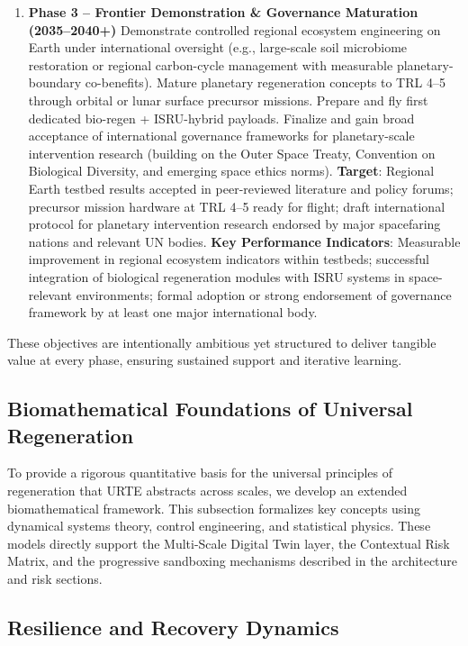 \documentclass[11pt,a4paper]{article}
\begin{document}
\begin{enumerate}[leftmargin=*,itemsep=0.25em]
    \item \textbf{Phase 3 -- Frontier Demonstration \& Governance Maturation (2035--2040+)}  
    Demonstrate controlled regional ecosystem engineering on Earth under international oversight (e.g., large-scale soil microbiome restoration or regional carbon-cycle management with measurable planetary-boundary co-benefits). Mature planetary regeneration concepts to TRL 4--5 through orbital or lunar surface precursor missions. Prepare and fly first dedicated bio-regen + ISRU-hybrid payloads. Finalize and gain broad acceptance of international governance frameworks for planetary-scale intervention research (building on the Outer Space Treaty, Convention on Biological Diversity, and emerging space ethics norms).  
    \textbf{Target}: Regional Earth testbed results accepted in peer-reviewed literature and policy forums; precursor mission hardware at TRL 4--5 ready for flight; draft international protocol for planetary intervention research endorsed by major spacefaring nations and relevant UN bodies.  
    \textbf{Key Performance Indicators}: Measurable improvement in regional ecosystem indicators within testbeds; successful integration of biological regeneration modules with ISRU systems in space-relevant environments; formal adoption or strong endorsement of governance framework by at least one major international body.
\end{enumerate}

These objectives are intentionally ambitious yet structured to deliver tangible value at every phase, ensuring sustained support and iterative learning.


\subsection{Biomathematical Foundations of Universal Regeneration}

To provide a rigorous quantitative basis for the universal principles of regeneration that URTE abstracts across scales, we develop an extended biomathematical framework. This subsection formalizes key concepts using dynamical systems theory, control engineering, and statistical physics. These models directly support the Multi-Scale Digital Twin layer, the Contextual Risk Matrix, and the progressive sandboxing mechanisms described in the architecture and risk sections.

\subsection{Resilience and Recovery Dynamics}
\end{document}
